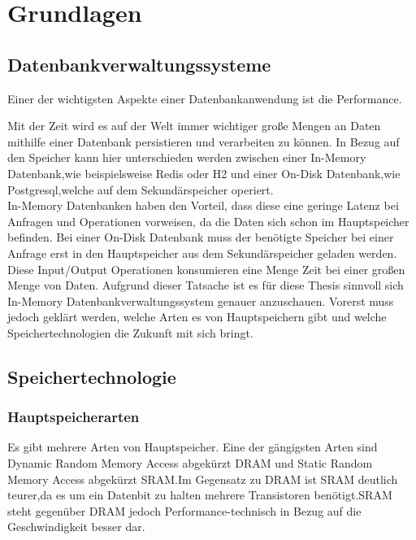 \chapter{Grundlagen}

\section{Datenbankverwaltungssysteme}

Einer der wichtigsten Aspekte einer Datenbankanwendung ist die Performance. 

Mit der Zeit wird es auf der Welt immer wichtiger große Mengen an Daten mithilfe einer Datenbank persistieren und verarbeiten zu können.
In Bezug auf den Speicher kann hier unterschieden werden zwischen einer In-Memory Datenbank,wie beispielsweise Redis oder H2 und einer On-Disk Datenbank,wie Postgresql,welche auf dem Sekundärspeicher operiert. \\

In-Memory Datenbanken haben den Vorteil, dass diese eine geringe Latenz bei Anfragen und Operationen vorweisen, da die Daten sich schon im Hauptspeicher befinden. Bei einer On-Disk Datenbank muss der benötigte Speicher bei einer Anfrage erst in den Hauptspeicher aus dem Sekundärspeicher geladen werden. Diese Input/Output Operationen konsumieren eine Menge Zeit bei einer großen Menge von Daten.\cite{KABAKUS2017520}
Aufgrund dieser Tatsache ist es für diese Thesis sinnvoll sich In-Memory Datenbankverwaltungssystem genauer anzuschauen. 
Vorerst muss jedoch geklärt werden, welche Arten es von Hauptspeichern gibt und welche Speichertechnologien die Zukunft mit sich bringt.

\section{Speichertechnologie}

\subsection{Hauptspeicherarten}

Es gibt mehrere Arten von Hauptspeicher. Eine der gängigsten Arten sind Dynamic Random Memory Access abgekürzt DRAM und Static Random Memory Access abgekürzt SRAM.Im Gegensatz zu DRAM ist SRAM deutlich teurer,da es um ein Datenbit zu halten mehrere Transistoren benötigt.SRAM steht gegenüber DRAM jedoch Performance-technisch in Bezug auf die Geschwindigkeit besser dar.\cite{techtarget:Ram}

